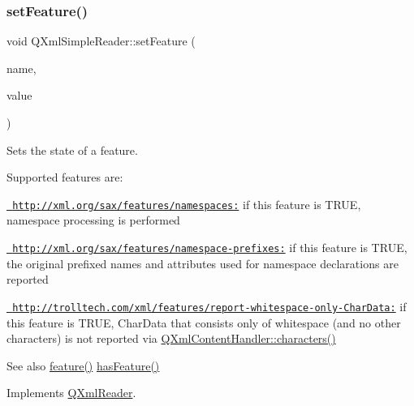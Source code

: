 \mbox{\label{class_q_xml_simple_reader_a7e435e46bfe139249be78d89a89ff629}} 
\subsubsection{\texorpdfstring{setFeature()}{setFeature()}}
{\footnotesize\ttfamily void Q\+Xml\+Simple\+Reader\+::set\+Feature (\begin{DoxyParamCaption}\item[{const \mbox{\hyperlink{class_q_string}{Q\+String}} \&}]{name,  }\item[{bool}]{value }\end{DoxyParamCaption})\hspace{0.3cm}{\ttfamily [virtual]}}

Sets the state of a feature.

Supported features are\+: 
\begin{DoxyItemize}
\item \href{http://xml.org/sax/features/namespaces:}{\texttt{ http\+://xml.\+org/sax/features/namespaces\+:}} if this feature is T\+R\+UE, namespace processing is performed 
\item \href{http://xml.org/sax/features/namespace-prefixes:}{\texttt{ http\+://xml.\+org/sax/features/namespace-\/prefixes\+:}} if this feature is T\+R\+UE, the original prefixed names and attributes used for namespace declarations are reported 
\item \href{http://trolltech.com/xml/features/report-whitespace-only-CharData:}{\texttt{ http\+://trolltech.\+com/xml/features/report-\/whitespace-\/only-\/\+Char\+Data\+:}} if this feature is T\+R\+UE, Char\+Data that consists only of whitespace (and no other characters) is not reported via \mbox{\hyperlink{class_q_xml_content_handler_a3be0d440b48836560c8805e15d596eb1}{Q\+Xml\+Content\+Handler\+::characters()}} 
\end{DoxyItemize}

\begin{DoxySeeAlso}{See also}
\mbox{\hyperlink{class_q_xml_simple_reader_ae6b1a973ea59fc35b75d45ac5e30a303}{feature()}} \mbox{\hyperlink{class_q_xml_simple_reader_a6066183e6cbbab403e5cdf69a1410157}{has\+Feature()}} 
\end{DoxySeeAlso}


Implements \mbox{\hyperlink{class_q_xml_reader_a6673b0e33ef628df75410fabdafa3684}{Q\+Xml\+Reader}}.


